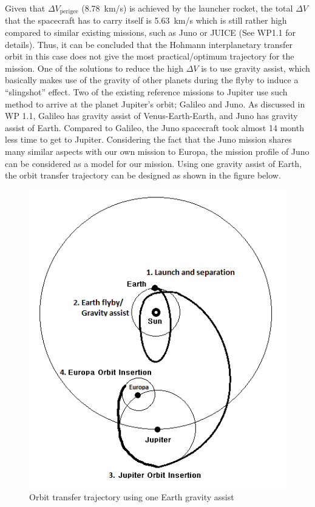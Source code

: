 Given that $\Delta V_\mathrm{perigee}$ (\SI{8.78}{km/s}) is achieved
by the launcher rocket, the total $\Delta V$ that the spacecraft has
to carry itself is \SI{5.63}{km/s} which is still rather high compared
to similar existing missions, such as Juno or JUICE (See WP1.1 for
details).  Thus, it can be concluded that the Hohmann interplanetary
transfer orbit in this case does not give the most practical/optimum
trajectory for the mission.  One of the solutions to reduce the high
$\Delta V$ is to use gravity assist, which basically makes use of the
gravity of other planets during the flyby to induce a “slingshot”
effect.  Two of the existing reference missions to Jupiter use such
method to arrive at the planet Jupiter’s orbit; Galileo and Juno.  As
discussed in WP 1.1, Galileo has gravity assist of Venus-Earth-Earth,
and Juno has gravity assist of Earth.  Compared to Galileo, the Juno
spacecraft took almost 14 month less time to get to
Jupiter.\cite{SolarSystemNasa} Considering the fact that the Juno
mission shares many similar aspects with our own mission to Europa,
the mission profile of Juno can be considered as a model for our
mission.  Using one gravity assist of Earth, the orbit transfer
trajectory can be designed as shown in the figure below.

\begin{figure}[H]
  \includegraphics[width=\textwidth]{Transfer-Orbits}
  \caption{Orbit transfer trajectory using one Earth gravity assist}
\end{figure}

